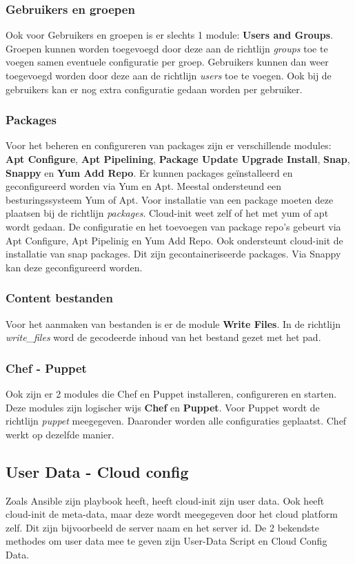 \subsubsection{Gebruikers en groepen}
Ook voor Gebruikers en groepen is er slechts 1 module: \textbf{Users and Groups}. Groepen kunnen worden toegevoegd door deze aan de richtlijn \textit{groups} toe te voegen samen eventuele configuratie per groep. Gebruikers kunnen dan weer toegevoegd worden door deze aan de richtlijn \textit{users} toe te voegen. Ook bij de gebruikers kan er nog extra configuratie gedaan worden per gebruiker.

\subsubsection{Packages}
Voor het beheren en configureren van packages zijn er verschillende modules: \textbf{Apt Configure}, \textbf{Apt Pipelining}, \textbf{Package Update Upgrade Install}, \textbf{Snap}, \textbf{Snappy} en \textbf{Yum Add Repo}. Er kunnen packages geïnstalleerd en geconfigureerd worden via Yum en Apt. Meestal ondersteund een besturingssysteem Yum of Apt. Voor installatie van een package moeten deze plaatsen bij de richtlijn \textit{packages}. Cloud-init weet zelf of het met yum of apt wordt gedaan. De configuratie en het toevoegen van package repo's gebeurt via Apt Configure, Apt Pipelinig en Yum Add Repo. Ook ondersteunt cloud-init de installatie van snap packages. Dit zijn gecontaineriseerde packages. Via Snappy kan deze geconfigureerd worden.

\subsubsection{Content bestanden}
Voor het aanmaken van bestanden is er de module \textbf{Write Files}. In de richtlijn \textit{write\_files} word de gecodeerde inhoud van het bestand gezet met het pad.

\subsubsection{Chef - Puppet}
Ook zijn er 2 modules die Chef en Puppet installeren, configureren en starten. Deze modules zijn logischer wijs \textbf{Chef} en \textbf{Puppet}. Voor Puppet wordt de richtlijn \textit{puppet} meegegeven. Daaronder worden alle configuraties geplaatst. Chef werkt op dezelfde manier.

\subsection{User Data - Cloud config}
Zoals Ansible zijn playbook heeft, heeft cloud-init zijn user data. Ook heeft cloud-init de meta-data, maar deze wordt meegegeven door het cloud platform zelf. Dit zijn bijvoorbeeld de server naam en het server id. De 2 bekendste methodes om user data mee te geven zijn User-Data Script en Cloud Config Data. 
